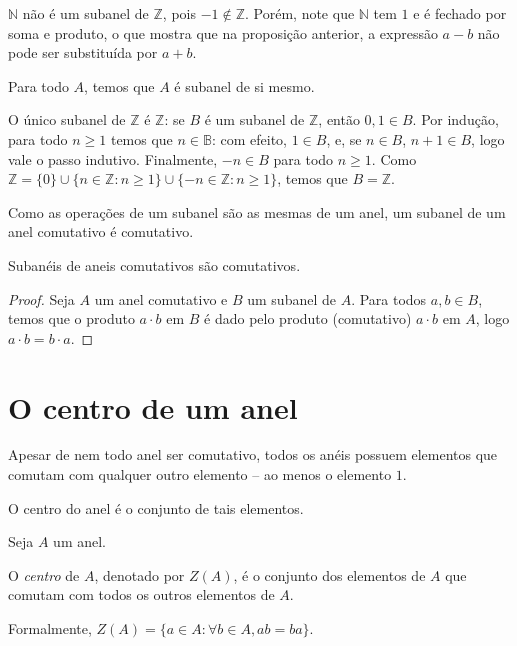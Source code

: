 \begin{exemplo}
$\mathbb N$ não é um subanel de $\mathbb Z$, pois $-1 \notin \mathbb Z$.
Porém, note que $\mathbb N$ tem $1$ e é fechado por soma e produto, o que mostra que na proposição anterior, a expressão $a-b$ não pode ser substituída por $a+b$.
\end{exemplo}

\begin{exemplo}
    Para todo $A$, temos que $A$ é subanel de si mesmo.
\end{exemplo}

\begin{exemplo}
O único subanel de $\mathbb Z$ é $\mathbb Z$: se $B$ é um subanel de $\mathbb Z$, então $0, 1 \in B$.
Por indução, para todo $n\geq 1$ temos que $n \in \mathbb B$: com efeito, $1\in B$, e, se $n \in B$, $n+1\in B$, logo vale o passo indutivo. Finalmente, $-n\in B$ para todo $n\geq 1$. Como $\mathbb Z=\{0\}\cup\{n \in \mathbb Z: n\geq 1\}\cup \{-n \in \mathbb Z: n\geq 1\}$, temos que $B=\mathbb Z$.
\end{exemplo}

Como as operações de um subanel são as mesmas de um anel, um subanel de um anel comutativo é comutativo.

\begin{prop}
    Subanéis de aneis comutativos são comutativos.
\end{prop}
\begin{proof}
Seja $A$ um anel comutativo e $B$ um subanel de $A$. Para todos $a, b \in B$, temos que o produto $a\cdot b$ em $B$ é dado pelo produto (comutativo) $a\cdot b$ em $A$, logo $a\cdot b=b\cdot a$.
\end{proof}

\section{O centro de um anel}
Apesar de nem todo anel ser comutativo, todos os anéis possuem elementos que comutam com qualquer outro elemento -- ao menos o elemento $1$.

O centro do anel é o conjunto de tais elementos.

\begin{definition}
    Seja $A$ um anel.

    O \emph{centro} de $A$, denotado por $Z(A)$, é o conjunto dos elementos de $A$ que comutam com todos os outros elementos de $A$.

    Formalmente, $Z(A)=\{a \in A: \forall b \in A, ab=ba\}$.
\end{definition}

